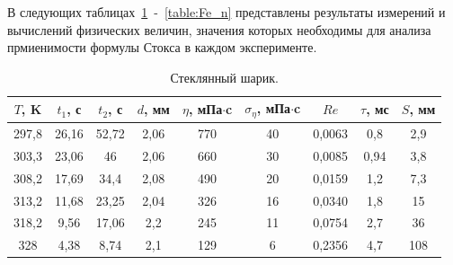 \documentclass[a4paper,12pt]{article} %
\begin{document}
	В следующих таблицах~\ref{table:glass_n}~-~\ref{table:Fe_n} представлены результаты измерений и вычислений физических величин, значения которых необходимы для анализа прмиенимости формулы Стокса в каждом эксперименте.
	\begin{table}[H]
		\caption{Стеклянный шарик.}
		\label{table:glass_n}
\begin{tabular}{|c|c|c|c|c|c|c|c|c|}
\hline
$T$, K & $t_1$, с & $t_2$, с & $d$, мм & $\eta$, мПа$\cdot$c & $\sigma_\eta$, мПа$\cdot$c & $Re$   & $\tau$, мс & $S$, мм \\ \hline
297,8  & 26,16    & 52,72    & 2,06    & 770                 & 40                         & 0,0063 & 0,8        & 2,9     \\ \hline
303,3  & 23,06    & 46       & 2,06    & 660                 & 30                         & 0,0085 & 0,94       & 3,8     \\ \hline
308,2  & 17,69    & 34,4     & 2,08    & 490                 & 20                         & 0,0159 & 1,2        & 7,3     \\ \hline
313,2  & 11,68    & 23,25    & 2,04    & 326                 & 16                         & 0,0340 & 1,8        & 15      \\ \hline
318,2  & 9,56     & 17,06    & 2,2     & 245                 & 11                         & 0,0754 & 2,7        & 36      \\ \hline
328    & 4,38     & 8,74     & 2,1     & 129                 & 6                          & 0,2356 & 4,7        & 108     \\ \hline
\end{tabular}
	\end{table}		
\end{document}
